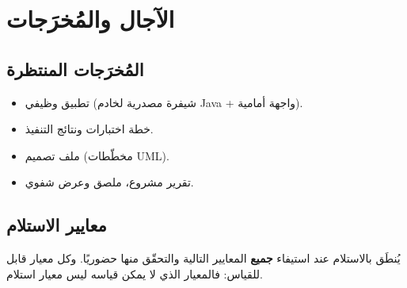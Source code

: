 \chapter{الآجال والمُخرَجات}
\label{chap:delais}

\section{المُخرَجات المنتظرة}
\begin{itemize}
  \item تطبيق وظيفي (شيفرة مصدرية لخادم Java + واجهة أمامية).
  \item خطة اختبارات ونتائج التنفيذ.
  \item ملف تصميم (مخطّطات UML).
  \item تقرير مشروع، ملصق وعرض شفوي.
\end{itemize}

\section{معايير الاستلام}
يُنطَق بالاستلام عند استيفاء \textbf{جميع} المعايير التالية والتحقّق منها
حضوريًا. وكل معيار قابل للقياس: فالمعيار الذي لا يمكن قياسه ليس معيار استلام.

